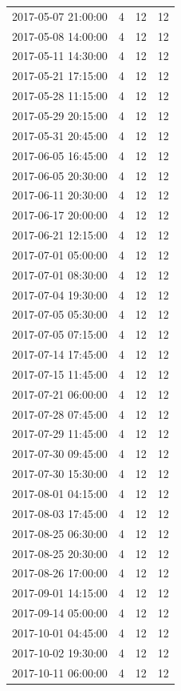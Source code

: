 \begin{tabular}{lrrr}
2017-05-07 21:00:00 & 4 & 12 & 12 \\
2017-05-08 14:00:00 & 4 & 12 & 12 \\
2017-05-11 14:30:00 & 4 & 12 & 12 \\
2017-05-21 17:15:00 & 4 & 12 & 12 \\
2017-05-28 11:15:00 & 4 & 12 & 12 \\
2017-05-29 20:15:00 & 4 & 12 & 12 \\
2017-05-31 20:45:00 & 4 & 12 & 12 \\
2017-06-05 16:45:00 & 4 & 12 & 12 \\
2017-06-05 20:30:00 & 4 & 12 & 12 \\
2017-06-11 20:30:00 & 4 & 12 & 12 \\
2017-06-17 20:00:00 & 4 & 12 & 12 \\
2017-06-21 12:15:00 & 4 & 12 & 12 \\
2017-07-01 05:00:00 & 4 & 12 & 12 \\
2017-07-01 08:30:00 & 4 & 12 & 12 \\
2017-07-04 19:30:00 & 4 & 12 & 12 \\
2017-07-05 05:30:00 & 4 & 12 & 12 \\
2017-07-05 07:15:00 & 4 & 12 & 12 \\
2017-07-14 17:45:00 & 4 & 12 & 12 \\
2017-07-15 11:45:00 & 4 & 12 & 12 \\
2017-07-21 06:00:00 & 4 & 12 & 12 \\
2017-07-28 07:45:00 & 4 & 12 & 12 \\
2017-07-29 11:45:00 & 4 & 12 & 12 \\
2017-07-30 09:45:00 & 4 & 12 & 12 \\
2017-07-30 15:30:00 & 4 & 12 & 12 \\
2017-08-01 04:15:00 & 4 & 12 & 12 \\
2017-08-03 17:45:00 & 4 & 12 & 12 \\
2017-08-25 06:30:00 & 4 & 12 & 12 \\
2017-08-25 20:30:00 & 4 & 12 & 12 \\
2017-08-26 17:00:00 & 4 & 12 & 12 \\
2017-09-01 14:15:00 & 4 & 12 & 12 \\
2017-09-14 05:00:00 & 4 & 12 & 12 \\
2017-10-01 04:45:00 & 4 & 12 & 12 \\
2017-10-02 19:30:00 & 4 & 12 & 12 \\
2017-10-11 06:00:00 & 4 & 12 & 12 \\

\end{tabular}
